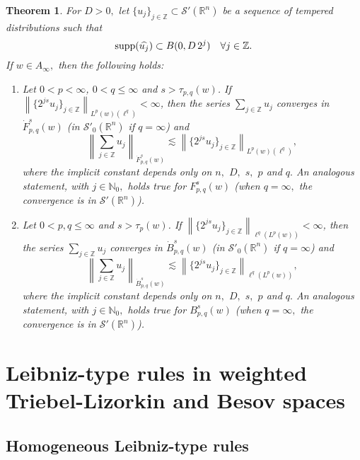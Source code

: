 \documentclass[10pt,a4paper]{article}
\newtheorem{theorem}{Theorem}[section]
\theoremstyle{remark}
\newcommand{\naz}{\mathbb{N}_0}
\newcommand{\ent}{\mathbb{Z}}
\newcommand{\rn}{{{\mathbb R}^n}}
\newcommand{\swp}{{\mathcal{S}'}(\rn)}
\newcommand{\tlw}[4]{\dot F_{#1,#3}^{#2}(#4)} %
\newcommand{\itlw}[4]{F_{#1,#3}^{#2}(#4)} %
\newcommand{\besw}[4]{\dot B_{#1,#3}^{#2}(#4)} %
\newcommand{\ibesw}[4]{B_{#1,#3}^{#2}(#4)} %
\newcommand{\norm}[2]{\left\|#1\right\|_{#2}}
\newcommand{\supp}{{\rm{supp}}}
\newcommand{\A}{D}
\begin{document}
\begin{theorem}\label{thm:Nikolskij:weighted} For $\A> 0,$ let $\{u_j\}_{j \in \ent} \subset \mathcal{S}'(\rn)$ be a sequence of tempered distributions such that
\begin{equation*}
\supp(\widehat{u_j}) \subset B(0, \A\, 2^j ) \quad \forall j \in \ent.
\end{equation*}
If $w\in A_\infty,$ then the following holds:  
\begin{enumerate}
\item[(i)]\label{item:thh:Nikolskij:TL} Let $0 < p < \infty$, $0 < q \leq \infty$ and $s > \tau_{p,q}(w)$. If $\norm{\{2^{js} u_j\}_{j\in\ent}}{L^p(w)(\ell^{q})} < \infty$, then the series $\sum_{j \in \ent} u_j$ converges in $\tlw{p}{s}{q}{w}$ (in $\mathcal{S}'_0(\rn)$ if $q=\infty$) and 
\begin{equation*}
\norm{\sum_{j \in \ent} u_j}{\tlw{p}{s}{q}{w}} \lesssim  \norm{\{2^{js} u_j\}_{j\in\ent}}{L^p(w)(\ell^{q})},
\end{equation*}
where the implicit constant depends only on $n,$ $\A,$ $s,$ $p$ and  $q.$  An analogous statement, with $j\in\naz,$ holds true for $\itlw{p}{s}{q}{w}$ (when $q=\infty,$  the convergence is in $\swp$).
\item[(ii)]\label{item:thh:Nikolskij:B} Let $0 < p, q \leq \infty$ and $s > \tau_p(w)$. If $\norm{\{2^{js} u_j\}_{j\in\ent}}{\ell^{q}(L^p(w))} < \infty$, then the series $\sum_{j \in \ent} u_j$ converges in  $\besw{p}{s}{q}{w}$ (in $\mathcal{S}'_0(\rn)$ if $q=\infty$) and 
\begin{equation*}
\norm{\sum_{j \in \ent} u_j}{\besw{p}{s}{q}{w}} \lesssim  \norm{\{2^{js} u_j\}_{j\in\ent}}{\ell^{q}(L^p(w))},
\end{equation*}
where the implicit constant depends only on $n,$ $\A,$ $s,$ $p$ and $q.$   An analogous statement, with $j\in\naz,$ holds true for $\ibesw{p}{s}{q}{w}$ (when $q=\infty,$  the convergence is in $\swp$).
\end{enumerate}
\end{theorem} 
 
 
 
 \section{Leibniz-type rules in weighted Triebel-Lizorkin and Besov spaces}\label{ch2_results}
 
 \subsection{Homogeneous Leibniz-type rules}
 
\end{document}
